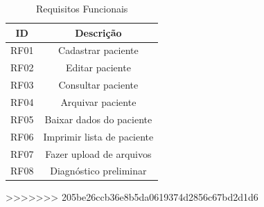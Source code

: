 \begin{anexosenv}
    \begin{table}[]
        \centering
        \caption{Requisitos Funcionais}
        \begin{tabular}{@{}|c|c|@{}}
        \toprule
        \textbf{ID} & \textbf{Descrição}         \\ \midrule
        RF01        & Cadastrar paciente         \\ \midrule
        RF02        & Editar paciente            \\ \midrule
        RF03        & Consultar paciente         \\ \midrule
        RF04        & Arquivar paciente          \\ \midrule
        RF05        & Baixar dados do paciente   \\ \midrule
        RF06        & Imprimir lista de paciente \\ \midrule
        RF07        & Fazer upload de arquivos   \\ \midrule
        RF08        & Diagnóstico preliminar     \\ \bottomrule
        \end{tabular}
        \label{table:Requisitos Funcionais}
    \end{table}
>>>>>>> 205be26ccb36e8b5da0619374d2856c67bd2d1d6

\end{anexosenv}

